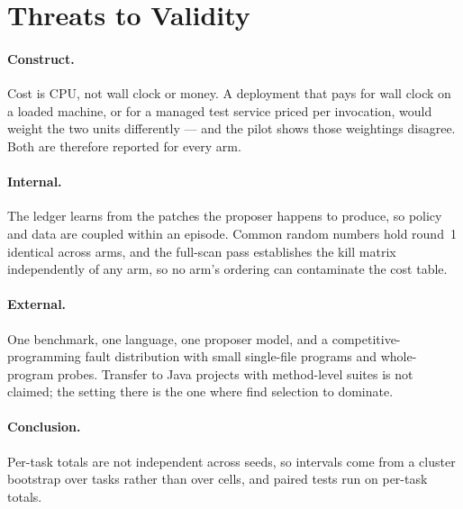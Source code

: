 \section{Threats to Validity}

\paragraph{Construct.} Cost is CPU, not wall clock or money. A deployment that
pays for wall clock on a loaded machine, or for a managed test service priced
per invocation, would weight the two units differently --- and the pilot shows
those weightings disagree. Both are therefore reported for every arm.

\paragraph{Internal.} The ledger learns from the patches the proposer happens
to produce, so policy and data are coupled within an episode. Common random
numbers hold round~1 identical across arms, and the full-scan  pass
establishes the kill matrix independently of any arm, so no arm's ordering can
contaminate the cost table.

\paragraph{External.} One benchmark, one language, one proposer model, and a
competitive-programming fault distribution with small single-file programs and
whole-program probes. Transfer to Java projects with method-level suites is not
claimed; the setting there is the one where
\citet{lou2024aprregression} find selection to dominate.

\paragraph{Conclusion.} Per-task totals are not independent across seeds, so
intervals come from a cluster bootstrap over tasks rather than over cells, and
paired tests run on per-task totals.
